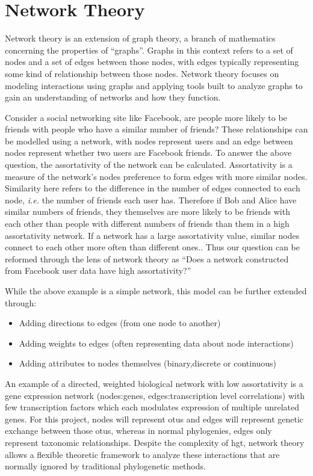 \documentclass[12pt,letter]{article}
\begin{document}
\section*{Network Theory}
Network theory is an extension of graph theory, a branch of mathematics concerning the properties of ``graphs''.
Graphs in this context refers to a set of nodes and a set of edges between those nodes, with edges typically representing some kind of relationship between those nodes\citep{netgen}.
Network theory focuses on modeling interactions using graphs and applying tools built to analyze graphs to gain an understanding of networks and how they function.\par
Consider a social networking site like Facebook, are people more likely to be friends with people who have a similar number of friends?
These relationships can be modelled using a network, with nodes represent users and an edge between nodes represent whether two users are Facebook friends.
To answer the above question, the assortativity of the network can be calculated.
Assortativity is a measure of the network's nodes preference to form edges with more similar nodes\citep{netgen}.
Similarity here refers to the difference in the number of edges connected to each node, \textit{i.e.} the number of friends each user has.
Therefore if Bob and Alice have similar numbers of friends, they themselves are more likely to be friends with each other than people with different numbers of friends than them in a high assortativity network.
If a network has a large assortativity value, similar nodes connect to each other more often than different ones.\citep{netgen}.
Thus our question can be reformed through the lens of network theory as ``Does a network constructed from Facebook user data have high assortativity?''
\begin{center}
\end{center}
While the above example is a simple network, this model can be further extended through:
\begin{itemize}
    \item Adding directions to edges (from one node to another)
    \item Adding weights to edges (often representing data about node interactions)
    \item Adding attributes to nodes themselves (binary,discrete or continuous)
\end{itemize}
An example of a directed, weighted biological network with low assortativity is a gene expression network (nodes:genes, edges:transcription level correlations) with few transcription factors which each modulates expression of multiple unrelated genes.
For this project, nodes will represent \ac{otu}s and edges will represent genetic exchange between those \ac{otu}s, whereas in normal phylogenies, edges only represent taxonomic relationships.
Despite the complexity of \ac{hgt}, network theory allows a flexible theoretic framework to analyze these interactions that are normally ignored by traditional phylogenetic methods.
\end{document}

